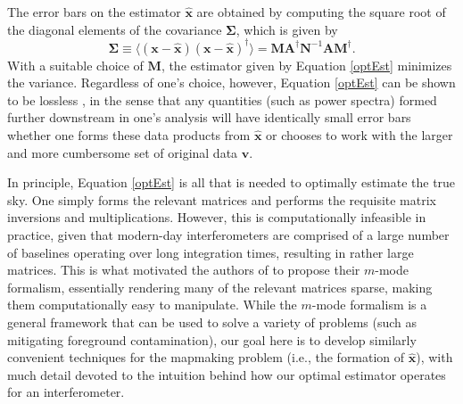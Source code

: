 \documentclass[twocolumn,apj,numberedappendix]{emulateapj}
\newcommand{\vis}{\mathbf{v}}
\newcommand{\x}{\mathbf{x}}
\newcommand{\xhat}{\hat{\mathbf{x}}}
\newcommand{\A}{\mathbf{A}}
\newcommand{\N}{\mathbf{N}}
\begin{document}
The error bars on the estimator $\xhat$ are obtained by computing the square root
of the diagonal elements of the covariance $\boldsymbol \Sigma$, which is given by
\begin{equation}
\label{eq:sigma}
\boldsymbol \Sigma \equiv \langle (\x - \xhat) ( \x - \xhat)^\dagger \rangle = \mathbf{M} \A^\dagger \N^{-1} \A\mathbf{M}^\dagger.
\end{equation}
With a suitable choice of $\mathbf{M}$, the estimator given by Equation \eqref{optEst}
minimizes the variance. Regardless of one's choice, however, Equation \eqref{optEst} 
can be shown to be lossless \citep{T97mapmaking}, in the sense that any quantities (such as power
spectra) formed further downstream in one's analysis will have identically
small error bars whether one forms these data products from $\xhat$ or chooses
to work with the larger and more cumbersome set of original data $\vis$.
%
%
%

In principle, Equation \eqref{optEst} is all that is needed to optimally
estimate the true sky.  One simply forms the relevant matrices and performs the
requisite matrix inversions and multiplications.  However, this is
computationally infeasible in practice, given that modern-day interferometers
are comprised of a large number of baselines operating over long integration
times, resulting in rather large matrices.  This is what motivated the authors
of \cite{Shaw2013} to propose their $m$-mode formalism, essentially rendering
many of the relevant matrices sparse, making them computationally easy to
manipulate.  While the $m$-mode formalism is a general framework that can be
used to solve a variety of problems (such as mitigating foreground
contamination), our goal here is to develop similarly convenient techniques for
the mapmaking problem (i.e., the formation of $\xhat$), with much detail
devoted to the intuition behind how our optimal estimator operates for an
interferometer.
\end{document}
